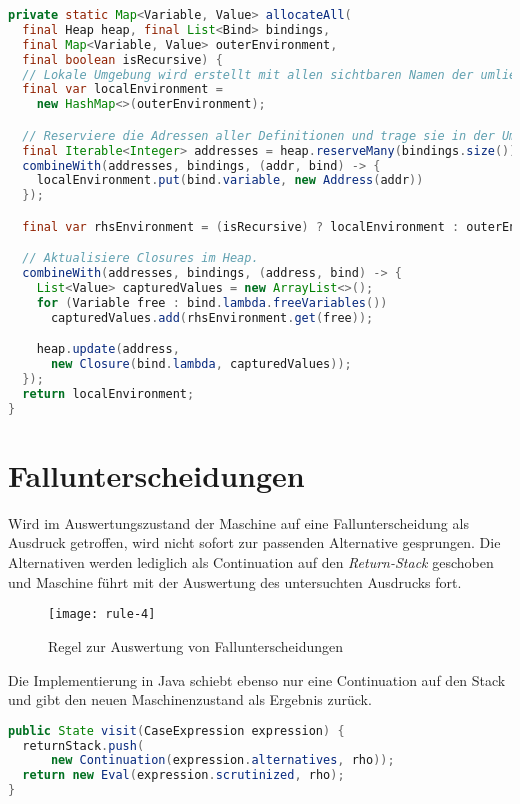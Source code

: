 \begin{lstlisting}[language=java, caption={Funktion \texttt{allocateAll} zum Anlegen rekursiver Namensbindungen}, label={lst:allocate-all}]
private static Map<Variable, Value> allocateAll(
  final Heap heap, final List<Bind> bindings,
  final Map<Variable, Value> outerEnvironment,
  final boolean isRecursive) {
  // Lokale Umgebung wird erstellt mit allen sichtbaren Namen der umliegenden Umgebung.
  final var localEnvironment =
    new HashMap<>(outerEnvironment);

  // Reserviere die Adressen aller Definitionen und trage sie in der Umgebung ein.
  final Iterable<Integer> addresses = heap.reserveMany(bindings.size());
  combineWith(addresses, bindings, (addr, bind) -> {
    localEnvironment.put(bind.variable, new Address(addr))
  });

  final var rhsEnvironment = (isRecursive) ? localEnvironment : outerEnvironment;

  // Aktualisiere Closures im Heap.
  combineWith(addresses, bindings, (address, bind) -> {
    List<Value> capturedValues = new ArrayList<>();
    for (Variable free : bind.lambda.freeVariables())
      capturedValues.add(rhsEnvironment.get(free));

    heap.update(address,
      new Closure(bind.lambda, capturedValues));
  });
  return localEnvironment;
}
\end{lstlisting}

\vfill


\section{Fallunterscheidungen}

Wird im Auswertungszustand der Maschine auf eine Fallunterscheidung als Ausdruck getroffen, wird nicht sofort zur passenden Alternative gesprungen.
Die Alternativen werden lediglich als Continuation auf den \textit{Return-Stack} geschoben und Maschine führt mit der Auswertung des untersuchten Ausdrucks fort.

\begin{figure}[h]
  \centering
  \texttt{[image: rule-4]}
  \caption{Regel zur Auswertung von Fallunterscheidungen}\label{fig:rule-4}
\end{figure}

Die Implementierung in Java schiebt ebenso nur eine Continuation auf den Stack und gibt den neuen Maschinenzustand als Ergebnis zurück.

\begin{lstlisting}[language=java]
public State visit(CaseExpression expression) {
  returnStack.push(
      new Continuation(expression.alternatives, rho));
  return new Eval(expression.scrutinized, rho);
}
\end{lstlisting}

